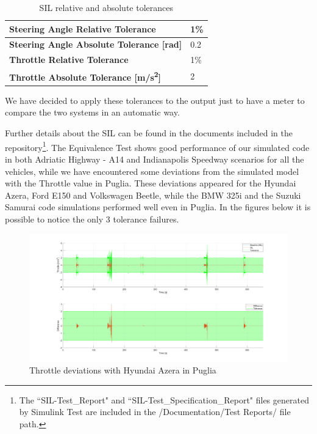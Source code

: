 \begin{table}[H]
\centering
\begin{tabular}{|l|p{2cm}|}
\hline
\textbf{Steering Angle Relative Tolerance}                        & 1\% \\ \hline
\textbf{Steering Angle Absolute Tolerance {[}rad{]}}              & 0.2 \\ \hline
\textbf{Throttle Relative Tolerance}                              & 1\% \\ \hline
\textbf{Throttle Absolute Tolerance {[}m/s\textsuperscript2{]}} & 2   \\ \hline
\end{tabular}



\caption{SIL relative and absolute tolerances}
\label{tab:SIL_Tolerance}
\end{table}

We have decided to apply these tolerances to the output just to have a meter to compare the two systems in an automatic way.

\pagebreak

Further details about the SIL can be found in the documents included in the repository\footnote{The ``SIL-Test\_Report" and ``SIL-Test\_Specification\_Report" files generated by Simulink Test are included in the /Documentation/Test Reports/ file path.}. 
The Equivalence Test shows good performance of our simulated code in both Adriatic Highway - A14 and Indianapolis Speedway scenarios for all the vehicles, while we have encountered some deviations from the simulated model with the Throttle value in Puglia. These deviations appeared for the Hyundai Azera, Ford E150 and Volkswagen Beetle, while the BMW 325i and the Suzuki Samurai code simulations performed well even in Puglia. In the figures below it is possible to notice the only 3 tolerance failures.

    \begin{figure}[H]
    \centering
    \includegraphics[width=1.1\textwidth,keepaspectratio]{Figures/throttle_azera.png}
    \caption{Throttle deviations with Hyundai Azera in Puglia}
    \label{fig:throttle_azera}
    \end{figure}%
    
